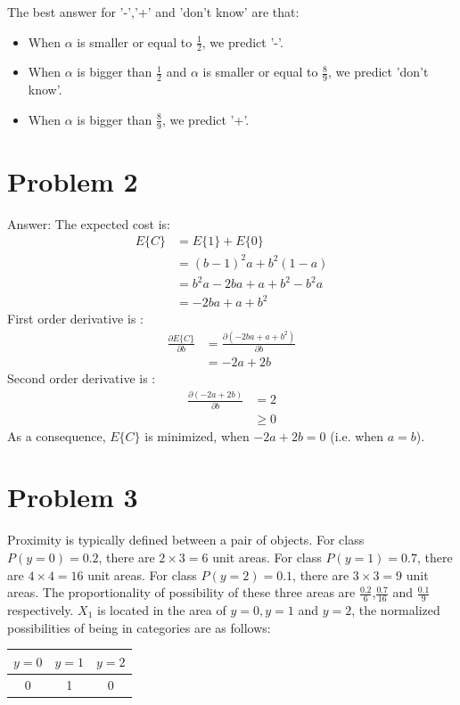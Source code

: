 \documentclass[paper=a4, fontsize=11pt]{scrartcl} %
\numberwithin{equation}{section} %
\numberwithin{figure}{section} %
\numberwithin{table}{section} %
\begin{document}
The best answer for '-','+' and 'don't know' are that:

\begin{itemize}
  \item When $\alpha$ is smaller or equal to $\frac{1}{2}$, we predict '-'.
  \item When $\alpha$ is bigger than $\frac{1}{2}$ and $\alpha$ is smaller or equal to $\frac{8}{9}$, we predict 'don't know'.
  \item When $\alpha$ is bigger than $\frac{8}{9}$, we predict '+'.
\end{itemize}

\section{Problem 2}
Answer:
\newline
\newline
The expected cost is:
\begin{align}
E\{C\} &= E\{1\} + E\{0\}\\
&=  (b-1)^2 a + b^2(1-a) \\
&=  b^2a-2ba+a + b^2 - b^2a \\
&= -2ba + a + b^2 
\end{align}
First order derivative is :
\begin{align}
\frac{\partial E\{C\}}{\partial b} &=  \frac{\partial (-2ba + a + b^2)}{\partial b} \\
&= -2a + 2b
\end{align}
Second order derivative is :
\begin{align}
\frac{\partial (-2a + 2b)}{\partial b} &=  2  \\
&\geq 0
\end{align}
As a consequence, $E\{C\}$ is minimized, when $-2a + 2b = 0$ (i.e. when $a = b $).
\newline
\newline
\section{Problem 3}
Proximity is typically defined between a pair of objects.
\newline
\newline
For class $P(y = 0) = 0.2$, there are $2 \times 3 = 6 $ unit areas. For class $P(y = 1) = 0.7$, there are $4 \times 4 = 16 $ unit areas. For class $P(y = 2) = 0.1$, there are $3 \times 3 = 9 $ unit areas. The proportionality of possibility of these three areas are $\frac{0.2}{6}$,$\frac{0.7}{16}$ and $\frac{0.1}{9}$ respectively.
\newline
\newline
\newline
$X_1$ is located in the area of $y = 0, y = 1$ and $y = 2$, the normalized possibilities of being in categories are as follows: 
\begin{table}[!htbp]
\centering
\begin{tabular}{|c|c|c|}
\hline 
$y = 0$ & $y = 1$ & $y = 2$ \\ 
\hline 
0 & 1 & 0 \\ 
\hline 
\end{tabular} 
\end{table}
\end{document}

